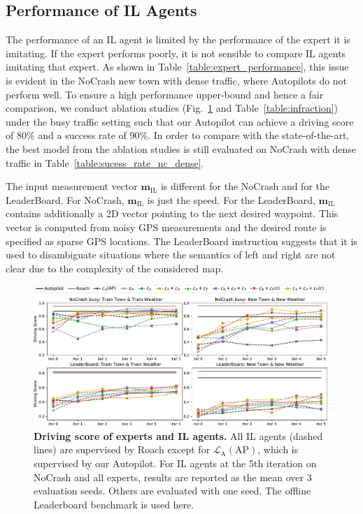 \subsection{Performance of IL Agents}
The performance of an IL agent is limited by the performance of the expert it is imitating.
If the expert performs poorly, it is not sensible to compare IL agents imitating that expert.
As shown in Table~\ref{table:expert_performance}, this issue is evident in the NoCrash new town with dense traffic, where Autopilots do not perform well. 
To ensure a high performance upper-bound and hence a fair comparison, we conduct ablation studies (Fig.~\ref{fig:score_eu_lb_tt_tn} and Table~\ref{table:infraction}) under the busy traffic setting such that our Autopilot can achieve a driving score of 80\% and a success rate of 90\%. 
In order to compare with the state-of-the-art, the best model from the ablation studies is still evaluated on NoCrash with dense traffic in Table~\ref{table:sucess_rate_nc_dense}.


The input measurement vector $\mathbf{m}_\text{IL}$ is different for the NoCrash and for the LeaderBoard. For NoCrash, $\mathbf{m}_\text{IL}$ is just the speed.
For the LeaderBoard, $\mathbf{m}_\text{IL}$ contains additionally a 2D vector pointing to the next desired waypoint.
This vector is computed from noisy GPS measurements and the desired route is specified as sparse GPS locations.
The LeaderBoard instruction suggests that it is used to disambiguate situations where the semantics of left and right are not clear due to the complexity of the considered map.
\begin{figure}[t]
	\centering
	\includegraphics[width=0.99\textwidth]{img/score_eu_lb_tt_tn.pdf}
	\vspace{-1ex}
	\caption{\textbf{Driving score of experts and IL agents.} All IL agents (dashed lines) are supervised by Roach except for $\mathcal{L}_\text{A}(\text{AP})$, which is supervised by our Autopilot. For IL agents at the 5th iteration on NoCrash and all experts, results are reported as the mean over 3 evaluation seeds. Others are evaluated with one seed. The offline Leaderboard benchmark is used here.}
	\vspace{-1.5ex}
	\label{fig:score_eu_lb_tt_tn}
\end{figure}


